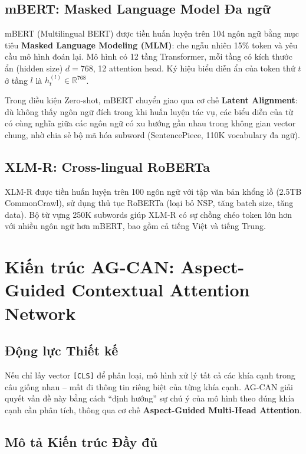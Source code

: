 \documentclass[12pt,a4paper,oneside]{report}
\begin{document}
\subsection{mBERT: Masked Language Model Đa ngữ}

mBERT (Multilingual BERT) được tiền huấn luyện trên 104 ngôn ngữ bằng mục tiêu \textbf{Masked Language Modeling (MLM)}: che ngẫu nhiên 15\% token và yêu cầu mô hình đoán lại. Mô hình có 12 tầng Transformer, mỗi tầng có kích thước ẩn (hidden size) $d = 768$, 12 attention head. Ký hiệu biểu diễn ẩn của token thứ $t$ ở tầng $l$ là $h_t^{(l)} \in \mathbb{R}^{768}$.

Trong điều kiện Zero-shot, mBERT chuyển giao qua cơ chế \textbf{Latent Alignment}: dù không thấy ngôn ngữ đích trong khi huấn luyện tác vụ, các biểu diễn của từ có cùng nghĩa giữa các ngôn ngữ có xu hướng gần nhau trong không gian vector chung, nhờ chia sẻ bộ mã hóa subword (SentencePiece, 110K vocabulary đa ngữ).

\subsection{XLM-R: Cross-lingual RoBERTa}

XLM-R được tiền huấn luyện trên 100 ngôn ngữ với tập văn bản khổng lồ (2.5TB CommonCrawl), sử dụng thủ tục RoBERTa (loại bỏ NSP, tăng batch size, tăng data). Bộ từ vựng 250K subwords giúp XLM-R có sự chồng chéo token lớn hơn với nhiều ngôn ngữ hơn mBERT, bao gồm cả tiếng Việt và tiếng Trung.

\section{Kiến trúc AG-CAN: Aspect-Guided Contextual Attention Network}

\subsection{Động lực Thiết kế}

Nếu chỉ lấy vector \texttt{[CLS]} để phân loại, mô hình xử lý tất cả các khía cạnh trong câu giống nhau -- mất đi thông tin riêng biệt của từng khía cạnh. AG-CAN giải quyết vấn đề này bằng cách ``định hướng'' sự chú ý của mô hình theo đúng khía cạnh cần phân tích, thông qua cơ chế \textbf{Aspect-Guided Multi-Head Attention}.

\subsection{Mô tả Kiến trúc Đầy đủ}
\end{document}
